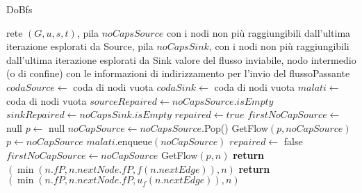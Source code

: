 \documentclass{article}
\begin{document}
\begin{algorithm}
    \caption{DoBfs}
    \begin{algorithmic}[1]
        \REQUIRE rete $(G,u,s,t)$, pila $noCapsSource$ con i nodi non più raggiungibili dall'ultima iterazione esplorati da Source, pila $noCapsSink$, con i nodi non più raggiungibili dall'ultima iterazione esplorati da Sink
        \ENSURE valore del flusso inviabile, nodo intermedio (o di confine) con le informazioni di indirizzamento per l'invio del flussoPassante
        \STATE {}
        \STATE $codaSource \leftarrow$ coda di nodi vuota
        \STATE $codaSink \leftarrow$ coda di nodi vuota
        \STATE $malati \leftarrow$ coda di nodi vuota
        \STATE $sourceRepaired \leftarrow noCapsSource.isEmpty$
        \STATE $sinkRepaired \leftarrow noCapsSink.isEmpty$
        \STATE {}
        \STATE $repaired \leftarrow true$
        \STATE $firstNoCapSource \leftarrow $ null
        \STATE $p \leftarrow $ null
        \STATE $noCapSource \leftarrow noCapsSource.$Pop()
        \STATE GetFlow$(p,noCapSource)$ 
        \STATE $p \leftarrow noCapSource$
        \STATE $malati.$enqueue$(noCapSource)$
        \STATE $repaired \leftarrow $ false
        \STATE $firstNoCapSource \leftarrow noCapSource$
        \ENDIF
        \ENDIF
        \ENDWHILE
        \STATE GetFlow$(p,n)$
        \STATE \textbf{return} $(\min(n.fP,n.nextNode.fP, f(n.nextEdge)),n)$
        \ELSE
        \STATE \textbf{return} $(\min(n.fP,n.nextNode.fP, u_f(n.nextEdge)),n)$
        \ENDIF
        \ENDIF
        \ENDFOR
        \ENDIF
    \end{algorithmic}
\end{algorithm}
\newpage
\end{document}
